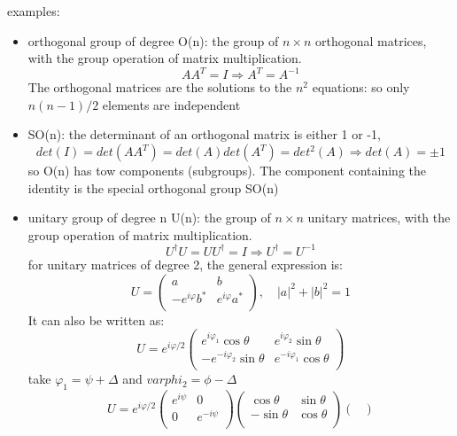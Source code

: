 examples:
\begin{itemize}
    \item orthogonal group of degree O(n): the group of $n \times n$ orthogonal 
	matrices, with the group operation of matrix multiplication.
	$$ AA^T = I \Rightarrow A^T = A^{-1}$$
	The orthogonal matrices are the solutions to the $n^2$ equations:
	so only $n(n-1)/2$ elements are independent
    \item SO(n): the determinant of an orthogonal matrix is either 1 or -1,
	$$ det(I) = det(AA^T) = det(A)det(A^T) = det^2(A) \Rightarrow det(A) = \pm 1$$
	so O(n) has tow components (subgroups). The component containing the 
	identity is the special orthogonal group SO(n)
    \item unitary group of degree n U(n): the group of $n \times n$ unitary 
	matrices, with the group operation of matrix multiplication.
	$$ U^\dag U = UU^\dag = I \Rightarrow U^\dag = U^{-1} $$
	for unitary matrices of degree 2, the general expression is:
	\begin{equation*}
	    U = 
	    \begin{pmatrix}
		a   & b	\\
		-e^{i\varphi} b^* & e^{i\varphi}a^* \\
	    \end{pmatrix},
	    \quad
	    |a|^2 + |b|^2 = 1
	\end{equation*}
	It can also be written as:
	\begin{equation*}
	    U =
	    e^{i\varphi/2}
	    \begin{pmatrix}
		e^{i\varphi_1} \cos\theta & e^{i\varphi_2}\sin\theta \\
		-e^{-i\varphi_2} \sin\theta & e^{-i\varphi_1}\cos\theta \\
	    \end{pmatrix}
	\end{equation*}
	take $\varphi_1 = \psi + \Delta$ and $varphi_2 = \phi - \Delta$
	\begin{equation*}
	    U =
	    e^{i\varphi/2}
	    \begin{pmatrix}
		e^{i\psi}   & 0	\\
		0   & e^{-i\psi}    \\
	    \end{pmatrix}
	    \begin{pmatrix}
		\cos\theta  & \sin\theta    \\
		-\sin\theta & \cos\theta    \\
	    \end{pmatrix}
	    \begin{pmatrix}

\end{pmatrix}
\end{equation*}
\end{itemize}
